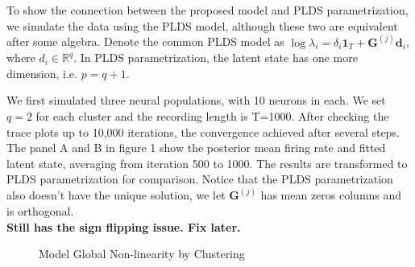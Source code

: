 \documentclass{article}
\begin{document}
	To show the connection between the proposed model and PLDS parametrization, we simulate the data using the PLDS model, although these two are equivalent after some algebra. Denote the common PLDS model as $\log \lambda_i = \delta_i\bm{1}_T + \bm{G}^{(j)}\bm{d}_i$, where $d_i\in \mathbb{R}^q$. In PLDS parametrization, the latent state has one more dimension, i.e. $p=q+1$.
	
	
	We first simulated three neural populations, with 10 neurons in each. We set $q=2$ for each cluster and the recording length is T=1000. After checking the trace plots up to 10,000 iterations, the convergence achieved after several steps. The panel A and B in figure 1 show the posterior mean firing rate and fitted latent state, averaging from iteration 500 to 1000. The results are transformed to PLDS parametrization for comparison. Notice that the PLDS parametrization also doesn't have the unique solution, we let $\bm{G}^{(j)}$ has mean zeros columns and is orthogonal.\\
	\textbf{Still has the sign flipping issue. Fix later.}
	
	\begin{figure}[h!]
		\centering
		
		\caption{Model Global Non-linearity by Clustering}
	\end{figure}
	
\end{document}
